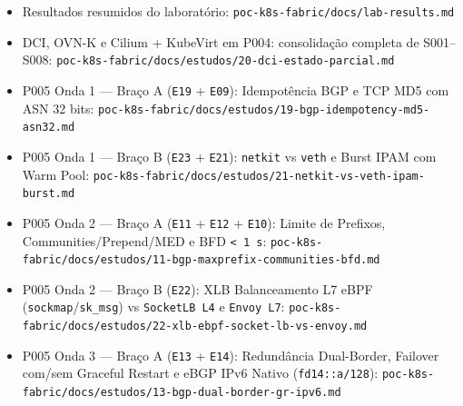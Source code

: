\documentclass[12pt,openany,oneside,a4paper,chapter=TITLE,english,brazil]{abntex2}
\providecommand{\tightlist}{\setlength{\itemsep}{0pt}\setlength{\parskip}{0pt}}
\begin{document}
\begin{apendicesenv}
\begin{itemize}
\tightlist
\item
  Resultados resumidos do laboratório: \texttt{poc-{}\allowbreak{}k8s-{}\allowbreak{}fabric/\allowbreak{}docs/\allowbreak{}lab-{}\allowbreak{}results.\allowbreak{}md}
\item
  DCI, OVN-K e Cilium + KubeVirt em P004: consolidação completa de S001--S008: \texttt{poc-{}\allowbreak{}k8s-{}\allowbreak{}fabric/\allowbreak{}docs/\allowbreak{}estudos/\allowbreak{}20-{}\allowbreak{}dci-{}\allowbreak{}estado-{}\allowbreak{}parcial.\allowbreak{}md}
\item
  P005 Onda 1 --- Braço A (\texttt{E19} + \texttt{E09}): Idempotência BGP e TCP MD5 com ASN 32 bits: \texttt{poc-{}\allowbreak{}k8s-{}\allowbreak{}fabric/\allowbreak{}docs/\allowbreak{}estudos/\allowbreak{}19-{}\allowbreak{}bgp-{}\allowbreak{}idempotency-{}\allowbreak{}md5-{}\allowbreak{}asn32.\allowbreak{}md}
\item
  P005 Onda 1 --- Braço B (\texttt{E23} + \texttt{E21}): \texttt{netkit} vs \texttt{veth} e Burst IPAM com Warm Pool: \texttt{poc-{}\allowbreak{}k8s-{}\allowbreak{}fabric/\allowbreak{}docs/\allowbreak{}estudos/\allowbreak{}21-{}\allowbreak{}netkit-{}\allowbreak{}vs-{}\allowbreak{}veth-{}\allowbreak{}ipam-{}\allowbreak{}burst.\allowbreak{}md}
\item
  P005 Onda 2 --- Braço A (\texttt{E11} + \texttt{E12} + \texttt{E10}): Limite de Prefixos, Communities/Prepend/MED e BFD \texttt{\textless{} 1 s}: \texttt{poc-{}\allowbreak{}k8s-{}\allowbreak{}fabric/\allowbreak{}docs/\allowbreak{}estudos/\allowbreak{}11-{}\allowbreak{}bgp-{}\allowbreak{}maxprefix-{}\allowbreak{}communities-{}\allowbreak{}bfd.\allowbreak{}md}
\item
  P005 Onda 2 --- Braço B (\texttt{E22}): XLB Balanceamento L7 eBPF (\texttt{sockmap}/\texttt{sk\_\allowbreak{}msg}) vs \texttt{Socket\allowbreak{}LB L4} e \texttt{Envoy L7}: \texttt{poc-{}\allowbreak{}k8s-{}\allowbreak{}fabric/\allowbreak{}docs/\allowbreak{}estudos/\allowbreak{}22-{}\allowbreak{}xlb-{}\allowbreak{}ebpf-{}\allowbreak{}socket-{}\allowbreak{}lb-{}\allowbreak{}vs-{}\allowbreak{}envoy.\allowbreak{}md}
\item
  P005 Onda 3 --- Braço A (\texttt{E13} + \texttt{E14}): Redundância Dual-Border, Failover com/sem Graceful Restart e eBGP IPv6 Nativo (\texttt{fd14:\allowbreak{}:\allowbreak{}a/\allowbreak{}128}): \texttt{poc-{}\allowbreak{}k8s-{}\allowbreak{}fabric/\allowbreak{}docs/\allowbreak{}estudos/\allowbreak{}13-{}\allowbreak{}bgp-{}\allowbreak{}dual-{}\allowbreak{}border-{}\allowbreak{}gr-{}\allowbreak{}ipv6.\allowbreak{}md}

\end{itemize}
\end{apendicesenv}
\end{document}
